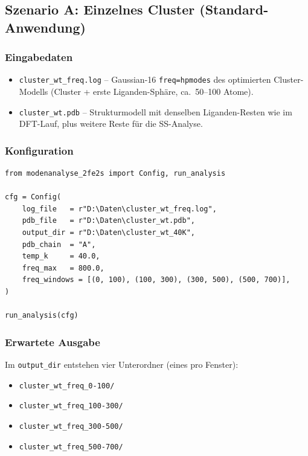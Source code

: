 \documentclass[11pt,a4paper,twoside]{article}
\theoremstyle{remark}
\begin{document}
\subsection{Szenario A: Einzelnes Cluster (Standard-Anwendung)}
\label{sec:workflow-single}

\subsubsection*{Eingabedaten}

\begin{itemize}
  \item \texttt{cluster\_wt\_freq.log} -- Gaussian-16 \texttt{freq=hpmodes}
        des optimierten Cluster-Modells (Cluster + erste Liganden-Sph\"are,
        ca.\ 50--100 Atome).
  \item \texttt{cluster\_wt.pdb} -- Strukturmodell mit denselben
        Liganden-Resten wie im DFT-Lauf, plus weitere Reste f\"ur
        die SS-Analyse.
\end{itemize}

\subsubsection*{Konfiguration}

\begin{lstlisting}[style=python]
from modenanalyse_2fe2s import Config, run_analysis

cfg = Config(
    log_file   = r"D:\Daten\cluster_wt_freq.log",
    pdb_file   = r"D:\Daten\cluster_wt.pdb",
    output_dir = r"D:\Daten\cluster_wt_40K",
    pdb_chain  = "A",
    temp_k     = 40.0,
    freq_max   = 800.0,
    freq_windows = [(0, 100), (100, 300), (300, 500), (500, 700)],
)

run_analysis(cfg)
\end{lstlisting}

\subsubsection*{Erwartete Ausgabe}

Im \texttt{output\_dir} entstehen vier Unterordner (eines pro Fenster):

\begin{itemize}
  \item \texttt{cluster\_wt\_freq\_0-100/}
  \item \texttt{cluster\_wt\_freq\_100-300/}
  \item \texttt{cluster\_wt\_freq\_300-500/}
  \item \texttt{cluster\_wt\_freq\_500-700/}
\end{itemize}
\end{document}
